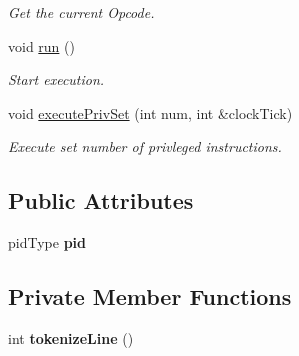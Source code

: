 \begin{DoxyCompactItemize}
\begin{DoxyCompactList}\small\item\em \-Get the current \-Opcode. \end{DoxyCompactList}\item 
void \hyperlink{classcCPU_aee300d68026ba9f13d5434ff82f0372a}{run} ()
\begin{DoxyCompactList}\small\item\em \-Start execution. \end{DoxyCompactList}\item 
void \hyperlink{classcCPU_a5d7b4d3ca9a197256dda6560072f036b}{execute\-Priv\-Set} (int num, int \&clock\-Tick)
\begin{DoxyCompactList}\small\item\em \-Execute set number of privleged instructions. \end{DoxyCompactList}\end{DoxyCompactItemize}
\subsection*{\-Public \-Attributes}
\begin{DoxyCompactItemize}
\item 
\hypertarget{classcCPU_abf8b9f3c8e99b0ea03d3051084f57dff}{pid\-Type {\bfseries pid}}\label{d2/dc6/classcCPU_abf8b9f3c8e99b0ea03d3051084f57dff}

\end{DoxyCompactItemize}
\subsection*{\-Private \-Member \-Functions}
\begin{DoxyCompactItemize}
\item 
\hypertarget{classcCPU_a62812ecc1a65c296fb4795b24b451f4e}{int {\bfseries tokenize\-Line} ()}\label{d2/dc6/classcCPU_a62812ecc1a65c296fb4795b24b451f4e}

\end{DoxyCompactItemize}
